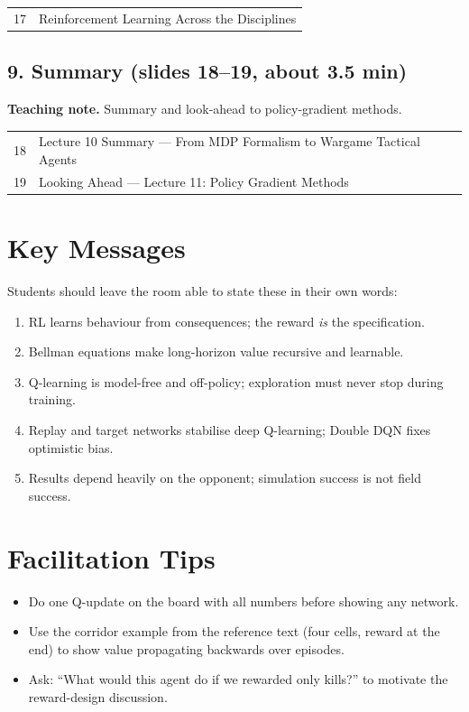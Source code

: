 \documentclass[11pt]{article}
\begin{document}
\begin{center}\small\renewcommand{\arraystretch}{1.1}\begin{tabularx}{\textwidth}{@{}r X@{}}17 & Reinforcement Learning Across the Disciplines\\\end{tabularx}\end{center}

\subsection{9. Summary \normalfont\small\color{GreyN}(slides 18--19, about 3.5 min)}

\textbf{Teaching note.} Summary and look-ahead to policy-gradient methods.

\begin{center}\small\renewcommand{\arraystretch}{1.1}\begin{tabularx}{\textwidth}{@{}r X@{}}18 & Lecture 10 Summary --- From MDP Formalism to Wargame Tactical Agents\\
19 & Looking Ahead --- Lecture 11: Policy Gradient Methods\\\end{tabularx}\end{center}

\section{Key Messages}Students should leave the room able to state these in their own words:\begin{keypoint}\begin{enumerate}\item RL learns behaviour from consequences; the reward \emph{is} the specification.\item Bellman equations make long-horizon value recursive and learnable.\item Q-learning is model-free and off-policy; exploration must never stop during training.\item Replay and target networks stabilise deep Q-learning; Double DQN fixes optimistic bias.\item Results depend heavily on the opponent; simulation success is not field success.\end{enumerate}\end{keypoint}

\section{Facilitation Tips}\begin{itemize}\item Do one Q-update on the board with all numbers before showing any network.\item Use the corridor example from the reference text (four cells, reward at the end) to show value propagating backwards over episodes.\item Ask: ``What would this agent do if we rewarded only kills?'' to motivate the reward-design discussion.\end{itemize}
\end{document}
